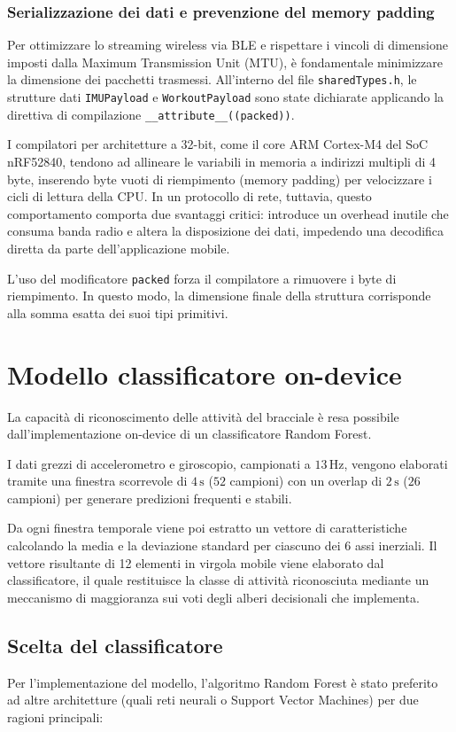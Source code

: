 \subsubsection{Serializzazione dei dati e prevenzione del memory padding}
Per ottimizzare lo streaming wireless via BLE e rispettare i vincoli di dimensione imposti dalla Maximum Transmission Unit (MTU), è fondamentale minimizzare la dimensione dei pacchetti trasmessi. All'interno del file \texttt{sharedTypes.h}, le strutture dati \texttt{IMUPayload} e \texttt{WorkoutPayload} sono state dichiarate applicando la direttiva di compilazione \texttt{\_\_attribute\_\_((packed))}.

I compilatori per architetture a 32-bit, come il core ARM Cortex-M4 del SoC nRF52840, tendono ad allineare le variabili in memoria a indirizzi multipli di 4 byte, inserendo byte vuoti di riempimento (memory padding) per velocizzare i cicli di lettura della CPU. In un protocollo di rete, tuttavia, questo comportamento comporta due svantaggi critici: introduce un overhead inutile che consuma banda radio e altera la disposizione dei dati, impedendo una decodifica diretta da parte dell'applicazione mobile.

L'uso del modificatore \texttt{packed} forza il compilatore a rimuovere i byte di riempimento. In questo modo, la dimensione finale della struttura corrisponde alla somma esatta dei suoi tipi primitivi.

\section{Modello classificatore on-device}
La capacità di riconoscimento delle attività del bracciale è resa possibile dall'implementazione on-device di un classificatore Random Forest.

I dati grezzi di accelerometro e giroscopio, campionati a $13\,\text{Hz}$, vengono elaborati tramite una finestra scorrevole di $4\,\text{s}$ ($52$ campioni) con un overlap di $2\,\text{s}$ ($26$ campioni) per generare predizioni frequenti e stabili.

Da ogni finestra temporale viene poi estratto un vettore di caratteristiche calcolando la media e la deviazione standard per ciascuno dei 6 assi inerziali. Il vettore risultante di 12 elementi in virgola mobile viene elaborato dal classificatore, il quale restituisce la classe di attività riconosciuta mediante un meccanismo di maggioranza sui voti degli alberi decisionali che implementa.

\subsection{Scelta del classificatore}
Per l'implementazione del modello, l'algoritmo Random Forest è stato preferito ad altre architetture (quali reti neurali o Support Vector Machines) per due ragioni principali:


